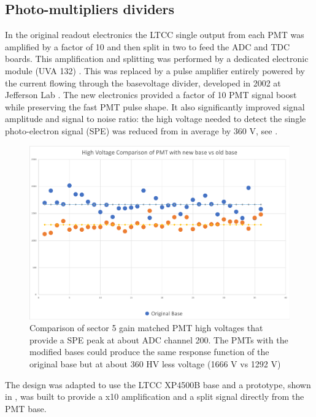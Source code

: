 \subsection{Photo-multipliers dividers}

In the original readout electronics the LTCC single output from each PMT was amplified by a factor of 10
and then split in two to feed the ADC and TDC boards. This amplification and splitting was performed
by a dedicated electronic module (UVA 132) \cite{Adams:2001kk}. This was replaced by a pulse amplifier entirely powered by
the current flowing through the basevoltage divider, developed in 2002 at Jefferson Lab \cite{Popov:2003mj}.
The new electronics provided a factor of 10 PMT signal boost while preserving the fast PMT pulse shape. It also significantly improved signal amplitude and
signal to noise ratio: the high voltage needed to detect the single photo-electron signal (SPE) was reduced from in average by 360 V, see .

\begin{figure}
	\centering
	\includegraphics[width=0.95\columnwidth,keepaspectratio]{img/pmtHVImprovement.png}
	\caption{Comparison of sector 5 gain matched PMT high voltages that provide a SPE peak at about ADC channel 200.
            The PMTs with the modified bases could produce the same response function of the original base but at about 360 HV less voltage (1666 V vs 1292 V)}
	\label{fig:pmtHVImprovement}
\end{figure}

The design was adapted to use the LTCC XP4500B base and a prototype, shown in , was built to provide a x10
amplification and a split signal directly from the PMT base.

